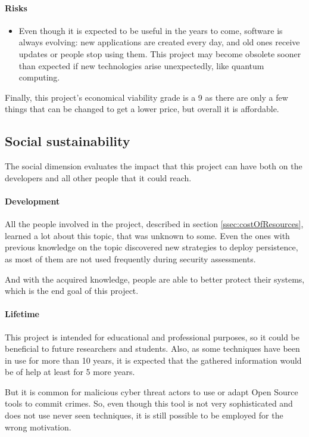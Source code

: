 \pagebreak
\paragraph{Risks}
\begin{itemize}
\item Even though it is expected to be useful in the years to come, software is always evolving: new applications are created every day, and old ones receive updates or people stop using them. This project may become obsolete sooner than expected if new technologies arise unexpectedly, like quantum computing.
\end{itemize}

Finally, this project's economical viability grade is a 9 as there are only a few things that can be changed to get a lower price, but overall it is affordable.

\subsection{Social sustainability}
The social dimension evaluates the impact that this project can have both on the developers and all other people that it could reach.

\paragraph{Development}
All the people involved in the project, described in section \ref{ssec:costOfResources}, learned a lot about this topic, that was unknown to some. Even the ones with previous knowledge on the topic discovered new strategies to deploy persistence, as most of them are not used frequently during security assessments.

And with the acquired knowledge, people are able to better protect their systems, which is the end goal of this project.

\paragraph{Lifetime}
This project is intended for educational and professional purposes, so it could be beneficial to future researchers and students. Also, as some techniques have been in use for more than 10 years, it is expected that the gathered information would be of help at least for 5 more years.

But it is common for malicious cyber threat actors to use or adapt Open Source tools to commit crimes. So, even though this tool is not very sophisticated and does not use never seen techniques, it is still possible to be employed for the wrong motivation.

